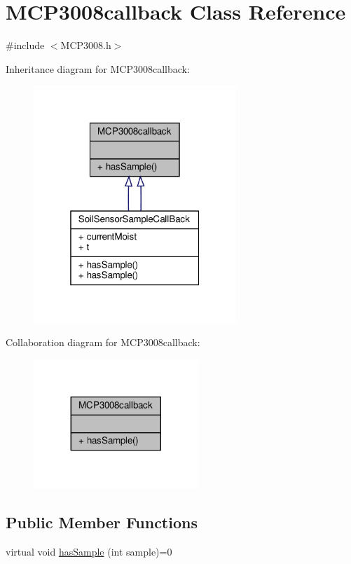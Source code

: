 \hypertarget{classMCP3008callback}{}\section{M\+C\+P3008callback Class Reference}
\label{classMCP3008callback}


{\ttfamily \#include $<$M\+C\+P3008.\+h$>$}



Inheritance diagram for M\+C\+P3008callback\+:
\nopagebreak
\begin{figure}[H]
\begin{center}
\leavevmode
\includegraphics[width=217pt]{classMCP3008callback__inherit__graph}
\end{center}
\end{figure}


Collaboration diagram for M\+C\+P3008callback\+:
\nopagebreak
\begin{figure}[H]
\begin{center}
\leavevmode
\includegraphics[width=176pt]{classMCP3008callback__coll__graph}
\end{center}
\end{figure}
\subsection*{Public Member Functions}
\begin{DoxyCompactItemize}
\item 
virtual void \hyperlink{classMCP3008callback_ad8c681193caaa955bf123666fc91e06a}{has\+Sample} (int sample)=0
\end{DoxyCompactItemize}


